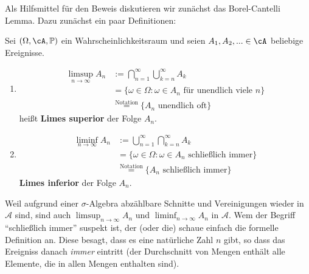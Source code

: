 \marginpar{\textcolor{red}{Vorlesung 26}}
	
Als Hilfsmittel f\"ur den Beweis diskutieren wir zun\"achst das Borel-Cantelli Lemma. Dazu zun\"achst ein paar Definitionen:	
\begin{deff}
	Sei $(\Omega, \cA, \mathbb{P})$ ein Wahrscheinlichkeitsraum und seien $A_1,A_2,... \in \cA$ beliebige Ereignisse.
	\begin{enumerate}[label=(\roman*)]
		\item \begin{align*}
			\limsup\limits_{n \to \infty} A_n 
			&:= \bigcap_{n=1}^{\infty} \bigcup_{k=n}^{\infty} A_k\\
			&= \{ \omega \in \Omega\colon \omega \in A_n \text{ für unendlich viele } n \}\\ 
			&\overset{\text{Notation}}{=} \{ A_n \text{ unendlich oft} \} 
		\end{align*}
		heißt \textbf{Limes superior} der Folge $A_n$.
		\item \begin{align*}
			\liminf\limits_{n \to \infty} A_n 
			&:= \bigcup_{n=1}^{\infty} \bigcap_{k=n}^{\infty} A_k\\
			&= \{ \omega \in \Omega\colon \omega \in A_n \text{ schließlich immer} \}\\
			&\overset{\text{Notation}}{=} \{ A_n \text{ schließlich immer} \}
		\end{align*}
		\textbf{Limes inferior} der Folge $A_n$.
	\end{enumerate}
\end{deff}
Weil aufgrund einer $\sigma$-Algebra abz\"ahlbare Schnitte und Vereinigungen wieder in $\mathcal A$ sind, sind auch $\limsup_{n\to\infty} A_n$ und $\liminf_{n\to\infty} A_n$ in $\mathcal A$. Wem der Begriff \enquote{schlie\ss lich immer} suspekt ist, der (oder die) schaue einfach die formelle Definition an. Diese besagt, dass es eine nat\"urliche Zahl $n$ gibt, so dass das Ereigniss danach \textit{immer} eintritt (der Durchschnitt von Mengen enth\"alt alle Elemente, die in allen Mengen enthalten sind).\smallskip

